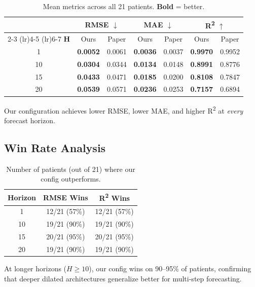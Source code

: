 \documentclass[11pt, a4paper]{article}
\begin{document}
\begin{table}[H]
\centering
\caption{Mean metrics across all 21 patients. \textbf{Bold} = better.}
\label{tab:results}
\begin{tabular}{c cc cc cc}
\toprule
& \multicolumn{2}{c}{\textbf{RMSE} $\downarrow$}
& \multicolumn{2}{c}{\textbf{MAE} $\downarrow$}
& \multicolumn{2}{c}{\textbf{R\textsuperscript{2}} $\uparrow$} \\
\cmidrule(lr){2-3} \cmidrule(lr){4-5} \cmidrule(lr){6-7}
\textbf{H} & Ours & Paper & Ours & Paper & Ours & Paper \\
\midrule
1  & \textbf{0.0052} & 0.0061 & \textbf{0.0036} & 0.0037 & \textbf{0.9970} & 0.9952 \\
10 & \textbf{0.0304} & 0.0344 & \textbf{0.0134} & 0.0148 & \textbf{0.8991} & 0.8776 \\
15 & \textbf{0.0433} & 0.0471 & \textbf{0.0185} & 0.0200 & \textbf{0.8108} & 0.7847 \\
20 & \textbf{0.0539} & 0.0571 & \textbf{0.0236} & 0.0253 & \textbf{0.7157} & 0.6894 \\
\bottomrule
\end{tabular}
\end{table}

\noindent Our configuration achieves lower RMSE, lower MAE, and higher R\textsuperscript{2} at \emph{every} forecast horizon.

\subsection{Win Rate Analysis}

\begin{table}[H]
\centering
\caption{Number of patients (out of 21) where our config outperforms.}
\label{tab:wins}
\begin{tabular}{ccc}
\toprule
\textbf{Horizon} & \textbf{RMSE Wins} & \textbf{R\textsuperscript{2} Wins} \\
\midrule
1  & 12/21 (57\%) & 12/21 (57\%) \\
10 & 19/21 (90\%) & 19/21 (90\%) \\
15 & 20/21 (95\%) & 20/21 (95\%) \\
20 & 19/21 (90\%) & 19/21 (90\%) \\
\bottomrule
\end{tabular}
\end{table}

\noindent At longer horizons ($H \geq 10$), our config wins on 90--95\% of patients, confirming that deeper dilated architectures generalize better for multi-step forecasting.
\end{document}
